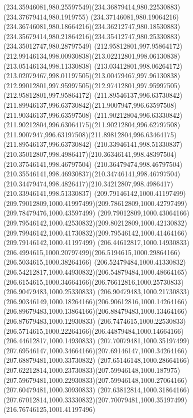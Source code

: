 {{		\curveto(234.35946081,980.25597549)(234.36879414,980.22530883)(234.37679414,980.1919755)
		\curveto(234.37146081,980.19064216)(234.36746081,980.18664216)(234.36212747,980.18530883)
		\curveto(234.35679414,980.21864216)(234.35412747,980.25330883)(234.35012747,980.28797549)
		\moveto(212.95812801,997.95864172)
		\curveto(212.99146134,998.00930838)(213.02212801,998.06130838)(213.05146134,998.11330838)
		\curveto(213.03412801,998.06264172)(213.02079467,998.01197505)(213.00479467,997.96130838)
		\curveto(212.99012801,997.95997505)(212.97412801,997.95997505)(212.95812801,997.95864172)
		\moveto(211.89546137,996.63730842)
		\curveto(211.89946137,996.63730842)(211.9007947,996.63597508)(211.90346137,996.63597508)
		\curveto(211.90212804,996.63330842)(211.90212804,996.63064175)(211.90212804,996.62797508)
		\curveto(211.9007947,996.63197508)(211.89812804,996.63464175)(211.89546137,996.63730842)
		\moveto(210.33946141,998.51330837)
		\curveto(210.35012807,998.4986417)(210.36346141,998.48397504)(210.37546141,998.46797504)
		\curveto(210.36479474,998.46797504)(210.35546141,998.46930837)(210.34746141,998.46797504)
		\curveto(210.34479474,998.4826417)(210.34212807,998.4986417)(210.33946141,998.51330837)
		\moveto(209.79146142,1000.41197499)
		\curveto(209.79012809,1000.41997499)(209.78612809,1000.42797499)(209.78479476,1000.43597499)
		\curveto(209.79012809,1000.43064166)(209.79546142,1000.42530832)(209.80212809,1000.42130832)
		\curveto(209.79946142,1000.41730832)(209.79546142,1000.41464166)(209.79146142,1000.41197499)
		\moveto(206.44612817,1000.14930833)
		\curveto(206.4994615,1000.20797499)(206.5194615,1000.29864166)(206.5034615,1000.38264166)
		\curveto(206.52479484,1000.41330832)(206.54212817,1000.44930832)(206.54879484,1000.48664165)
		\curveto(206.6154615,1000.34664166)(206.76612816,1000.25730833)(206.90479483,1000.25330833)
		\curveto(206.90479483,1000.21730833)(206.90346149,1000.18264166)(206.90612816,1000.14264166)
		\curveto(206.89679483,1000.13864166)(206.88479483,1000.13464166)(206.87679483,1000.12930833)
		\curveto(206.7474615,1000.22530833)(206.5714615,1000.22264166)(206.44879484,1000.14664166)
		\lineto(206.44612817,1000.14930833)
		\moveto(207.70079481,1000.35197499)
		\curveto(207.69546147,1000.34664166)(207.69146147,1000.34264166)(207.68879481,1000.33730832)
		\curveto(207.65146148,1000.28664166)(207.62212814,1000.23730833)(207.59946148,1000.187975)
		\curveto(207.59679481,1000.22930833)(207.59946148,1000.27064166)(207.60479481,1000.30930833)
		\curveto(207.63812814,1000.31864166)(207.67012814,1000.33330832)(207.70079481,1000.35197499)
		\moveto(216.76746125,1001.41197496)
}}
